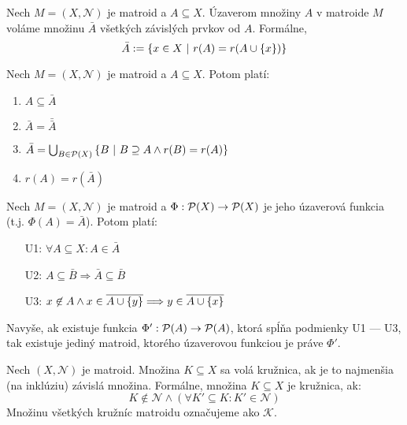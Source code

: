 \begin{definition}
Nech $M = (X, \mathcal{N})$ je matroid a $A \subseteq X$. Úzaverom množiny $A$ v matroide $M$ voláme množinu $\bar{A}$ všetkých závislých prvkov od $A$. Formálne,
$$\bar{A} := \left\{x \in X ~|~ r(A) = r(A \cup \left\{x\right\})\right\}$$
\end{definition}

\begin{theorem}
Nech $M = (X, \mathcal{N})$ je matroid a $A \subseteq X$. Potom platí:
\begin{enumerate}
    \item $A \subseteq \bar{A}$
    \item $\bar{A} = \bar{\bar{A}}$
    \item $\bar{A} = \bigcup_{B \in \mathcal{P}(X)} \left\{B ~|~ B \supseteq A \wedge r(B) = r(A)\right\}$
    \item $r(A) = r(\bar{A})$
\end{enumerate}
\end{theorem}

\begin{theorem}
Nech $M = (X, \mathcal{N})$ je matroid a $\Phi:\mathcal{P}(X) \to \mathcal{P}(X)$ je jeho úzaverová funkcia (t.j. $\Phi(A) = \bar{A}$).
Potom platí:
\begin{enumerate}
    \item[U1:] $\forall A \subseteq X: A \in \bar{A}$
    \item[U2:] $A \subseteq \bar{B} \Longrightarrow \bar{A} \subseteq \bar{B}$
    \item[U3:] $x \not\in A \wedge x \in \overline{A \cup \left\{y\right\}} \Longrightarrow y \in \overline{A \cup \left\{x\right\}}$
\end{enumerate}

Navyše, ak existuje funkcia $\Phi': \mathcal{P}(A) \to \mathcal{P}(A)$, ktorá spĺňa podmienky U1 --- U3, tak existuje jediný matroid,
ktorého úzaverovou funkciou je práve $\Phi'$.
\end{theorem}

\begin{definition}
Nech $(X, \mathcal{N})$ je matroid. Množina $K \subseteq X$ sa volá kružnica, ak je to najmenšia (na inklúziu) závislá množina. Formálne,
množina $K \subseteq X$ je kružnica, ak:
$$ K \not\in\mathcal{N} \wedge \left(\forall K' \subseteq K: K' \in\mathcal{N} \right)$$ 
\noindent
Množinu všetkých kružníc matroidu označujeme ako $\mathcal{K}$.
\end{definition}

